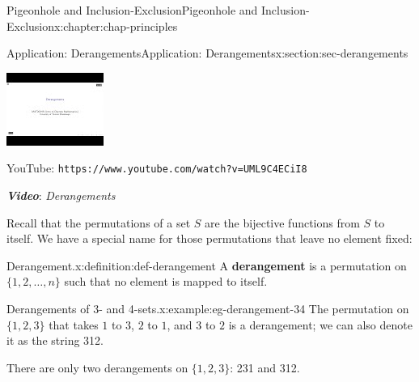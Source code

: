 \documentclass[oneside,10pt,]{book}
\newcommand{\mono}[1]{\texttt{#1}}
\newcommand{\alert}[1]{\textbf{\textit{#1}}}
\newcommand{\terminology}[1]{\textbf{#1}}
\numberwithin{equation}{section}
\newlength{\qrsize}
\newlength{\previewwidth}
\begin{document}
\begin{chapterptx}{Pigeonhole and Inclusion-Exclusion}{}{Pigeonhole and Inclusion-Exclusion}{}{}{x:chapter:chap-principles}
\begin{sectionptx}{Application: Derangements}{}{Application: Derangements}{}{}{x:section:sec-derangements}
\begin{sidebyside}{1}{0}{0}{0}
\begin{sbspanel}{1}
\begin{tcbraster}[raster columns=2, raster column skip=1pt, raster halign=center, raster force size=false, raster left skip=0pt, raster right skip=0pt]
\begin{tcolorbox}[previewstyle, width=\previewwidth]%
\includegraphics[width=0.80\linewidth,height=\qrsize,keepaspectratio]{images/video-derangements.jpg}%
\end{tcolorbox}%
\begin{tcolorbox}[qrstyle]%
{\hypersetup{urlcolor=black}}%
\end{tcolorbox}%
\begin{tcolorbox}[captionstyle]%
\small YouTube: \mono{https://www.youtube.com/watch?v=UML9C4ECiI8}\end{tcolorbox}%
\end{tcbraster}%
\end{sbspanel}%
\end{sidebyside}%
\par
\alert{Video}: \emph{Derangements}%
\par
Recall that the permutations of a set \(S\) are the bijective functions from \(S\) to itself. We have a special name for those permutations that leave no element fixed:%
\begin{definition}{Derangement.}{x:definition:def-derangement}%
A \terminology{derangement} is a permutation on \(\{1,2,\ldots,n\}\) such that no element is mapped to itself.%
\end{definition}
\begin{example}{Derangements of 3- and 4-sets.}{x:example:eg-derangement-34}%
The permutation on \(\{1,2,3\}\) that takes \(1\) to \(3\), \(2\) to \(1\), and \(3\) to \(2\) is a derangement; we can also denote it as the string 312.%
\par
There are only two derangements on \(\{1,2,3\}\): 231 and 312.%
\par

\end{example}
\end{sectionptx}
\end{chapterptx}
\end{document}
